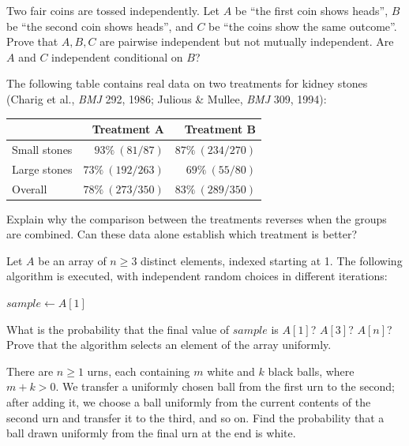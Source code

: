 \begin{problem}
Two fair coins are tossed independently. Let $A$ be ``the first coin shows heads'',
$B$ be ``the second coin shows heads'', and $C$ be ``the coins show the same outcome''.
Prove that $A,B,C$ are pairwise independent but not mutually independent.
Are $A$ and $C$ independent conditional on $B$?
\end{problem}
\begin{probleminteresting}
The following table contains real data on two treatments for kidney stones
(Charig et al., \emph{BMJ} 292, 1986; Julious \& Mullee, \emph{BMJ} 309, 1994):
\begin{center}\small
\begin{tabular}{@{}lrr@{}}
\toprule
 & Treatment A & Treatment B \\
\midrule
Small stones & $93\%\ (81/87)$ & $87\%\ (234/270)$ \\
Large stones & $73\%\ (192/263)$ & $69\%\ (55/80)$ \\
Overall & $78\%\ (273/350)$ & $83\%\ (289/350)$ \\
\bottomrule
\end{tabular}\end{center}
Explain why the comparison between the treatments reverses when the groups are combined.
Can these data alone establish which treatment is better?
\end{probleminteresting}
\begin{probleminteresting}
Let $A$ be an array of $n\ge3$ distinct elements, indexed starting at 1.
The following algorithm is executed, with independent random choices in different iterations:
\begin{algorithm}[H]
\caption{Reservoir sampling for one element}
$sample \gets A[1]$\;
\end{algorithm}
What is the probability that the final value of $sample$ is $A[1]$? $A[3]$? $A[n]$?
Prove that the algorithm selects an element of the array uniformly.
\end{probleminteresting}
\begin{problem}
There are $n\ge1$ urns, each containing $m$ white and $k$ black balls, where $m+k>0$.
We transfer a uniformly chosen ball from the first urn to the second; after adding it,
we choose a ball uniformly from the current contents of the second urn and transfer
it to the third, and so on. Find the probability that a ball drawn uniformly from
the final urn at the end is white.
\end{problem}
